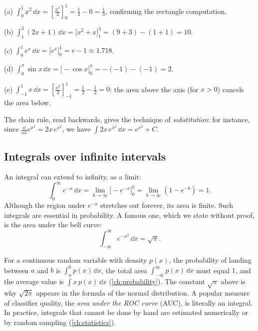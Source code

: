 \begin{example}\label{ex:definite-integrals}
(a) $\int_0^1 x^2\,\dd x = \left[\frac{x^3}{3}\right]_0^1 = \frac13 - 0 =
\frac13$, confirming the rectangle computation.

(b) $\int_1^3(2x + 1)\,\dd x = \bigl[x^2 + x\bigr]_1^3 = (9 + 3) - (1 + 1) =
10$.

(c) $\int_0^1 e^x\,\dd x = \bigl[e^x\bigr]_0^1 = e - 1 \approx 1.718$.

(d) $\int_0^\pi\sin x\,\dd x = \bigl[-\cos x\bigr]_0^\pi = -(-1) - (-1) = 2$.

(e) $\int_{-1}^{1}x\,\dd x = \left[\frac{x^2}{2}\right]_{-1}^{1} = \frac12 -
\frac12 = 0$: the area above the axis (for $x > 0$) cancels the area below.
\end{example}

The chain rule, read backwards, gives the technique of \emph{substitution}:
for instance, since $\frac{\dd}{\dd x}e^{x^2} = 2x\,e^{x^2}$, we have
$\int 2x\,e^{x^2}\,\dd x = e^{x^2} + C$.

\subsection{Integrals over infinite intervals}

An integral can extend to infinity, as a limit:
\[
  \int_0^\infty e^{-x}\,\dd x = \lim_{b\to\infty}\bigl[-e^{-x}\bigr]_0^b
  = \lim_{b\to\infty}\left(1 - e^{-b}\right) = 1 .
\]
Although the region under $e^{-x}$ stretches out forever, its area is finite.
Such integrals are essential in probability. A famous one, which we state
without proof, is the area under the bell curve:
\[
  \int_{-\infty}^{\infty} e^{-x^2}\,\dd x = \sqrt\pi .
\]

\begin{mlnote}
For a continuous random variable with density $p(x)$, the probability of
landing between $a$ and $b$ is $\int_a^b p(x)\,\dd x$, the total area
$\int_{-\infty}^{\infty}p(x)\,\dd x$ must equal $1$, and the average value is
$\int x\,p(x)\,\dd x$ (\cref{ch:probability}). The constant $\sqrt\pi$ above is
why $\sqrt{2\pi}$ appears in the formula of the normal distribution. A popular
measure of classifier quality, the \emph{area under the ROC curve} (AUC), is
literally an integral. In practice, integrals that cannot be done by hand are
estimated numerically or by random sampling (\cref{ch:statistics}).
\end{mlnote}

